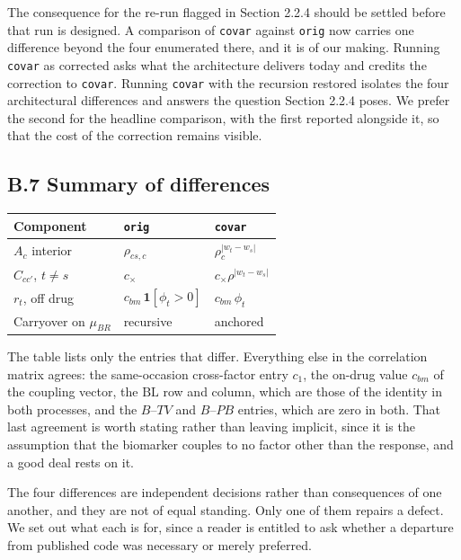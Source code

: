 \documentclass[
  11pt,
]{article}
\begin{document}
The consequence for the re-run flagged in Section 2.2.4 should be
settled before that run is designed. A comparison of \texttt{covar}
against \texttt{orig} now carries one difference beyond the four
enumerated there, and it is of our making. Running \texttt{covar} as
corrected asks what the architecture delivers today and credits the
correction to \texttt{covar}. Running \texttt{covar} with the
recursion restored isolates the four architectural differences and
answers the question Section 2.2.4 poses. We prefer the second for
the headline comparison, with the first reported alongside it, so
that the cost of the correction remains visible.

\subsection{B.7 Summary of differences}

\begin{center}
\begin{tabular}{lll}
\toprule
Component & \texttt{orig} & \texttt{covar}\\
\midrule
$A_c$ interior & $\rho_{cs,c}$ & $\rho_c^{|w_t - w_s|}$\\
$C_{cc'}$, $t \neq s$ & $c_{\times}$ & $c_{\times}\rho^{|w_t-w_s|}$\\
$r_t$, off drug & $c_{bm}\,\mathbf{1}[\phi_t > 0]$ & $c_{bm}\,\phi_t$\\
Carryover on $\mu_{BR}$ & recursive & anchored\\
\bottomrule
\end{tabular}
\end{center}

The table lists only the entries that differ. Everything else in the
correlation matrix agrees: the same-occasion cross-factor entry
\(c_1\), the on-drug value \(c_{bm}\) of the coupling vector, the
\(\mathrm{BL}\) row and column, which are those of the identity in both
processes, and the \(B\)--\(TV\) and \(B\)--\(PB\)
entries, which are zero in both. That last agreement is worth stating
rather than leaving implicit, since it is the assumption that the
biomarker couples to no factor other than the response, and a good
deal rests on it.

The four differences are independent decisions rather than
consequences of one another, and they are not of equal standing. Only
one of them repairs a defect. We set out what each is for, since a
reader is entitled to ask whether a departure from published code was
necessary or merely preferred.
\end{document}
